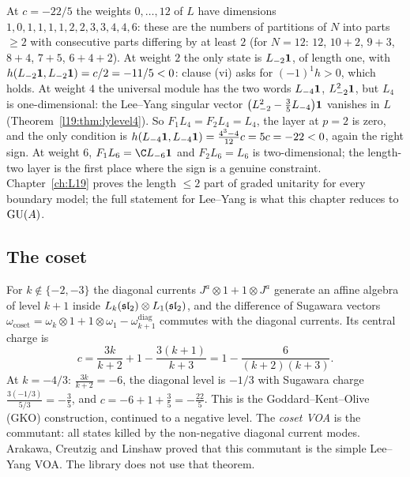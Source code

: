 \begin{example}\label{l28:ex:lylow}
At $c=-22/5$ the weights $0,\dots,12$ of $L$ have dimensions $1,0,1,1,1,1,2,2,3,3,4,4,6$: these are the numbers of
partitions of $N$ into parts $\ge2$ with consecutive parts differing by at least $2$ (for $N=12$: $12$, $10+2$, $9+3$,
$8+4$, $7+5$, $6+4+2$). At weight $2$ the only state is $L_{-2}\mathbf 1$, of length one, with
$h(L_{-2}\mathbf 1,L_{-2}\mathbf 1)=c/2=-11/5<0$: clause (vi) asks for $(-1)^1h>0$, which holds. At
weight $4$ the universal module has the two words $L_{-4}\mathbf 1$, $L_{-2}^2\mathbf 1$, but $L_4$ is
one-dimensional: the Lee--Yang singular vector $\bigl(L_{-2}^2-\tfrac35L_{-4}\bigr)\mathbf 1$ vanishes in $L$
(Theorem~\ref{l19:thm:lylevel4}). So $F_1L_4=F_2L_4=L_4$, the layer at $p=2$ is zero, and the only condition is
$h(L_{-4}\mathbf 1,L_{-4}\mathbf 1)=\tfrac{4^3-4}{12}c=5c=-22<0$, again the right sign. At weight $6$,
$F_1L_6=\C L_{-6}\ltwentyeightvac$ and $F_2L_6=L_6$ is two-dimensional; the length-two layer is the first place where
the sign is a genuine constraint. Chapter~\ref{ch:L19} proves the length $\le2$ part of graded unitarity for every
boundary model; the full statement for Lee--Yang is what this chapter reduces to $\mathrm{GU}(A)$.
\end{example}

\subsection{The coset}

For $k\notin\{-2,-3\}$ the diagonal currents $J^a\otimes1+1\otimes J^a$ generate an affine algebra of level $k+1$
inside $L_k(\mathfrak{sl}_2)\otimes L_1(\mathfrak{sl}_2)$, and the difference of Sugawara vectors
$\omega_{\mathrm{coset}}=\omega_k\otimes1+1\otimes\omega_1-\omega^{\mathrm{diag}}_{k+1}$ commutes with the diagonal
currents. Its central charge is
\begin{equation*}
c=\frac{3k}{k+2}+1-\frac{3(k+1)}{k+3}=1-\frac{6}{(k+2)(k+3)}.
\end{equation*}
At $k=-4/3$: $\tfrac{3k}{k+2}=-6$, the diagonal level is $-1/3$ with Sugawara charge $\tfrac{3(-1/3)}{5/3}=-\tfrac35$, and
$c=-6+1+\tfrac35=-\tfrac{22}5$. This is the Goddard--Kent--Olive (GKO) construction, continued to a negative level. The
\emph{coset VOA} is the commutant: all states killed by the non-negative diagonal current modes. Arakawa, Creutzig and
Linshaw proved that this commutant is the simple Lee--Yang VOA. The library does not use that theorem.

